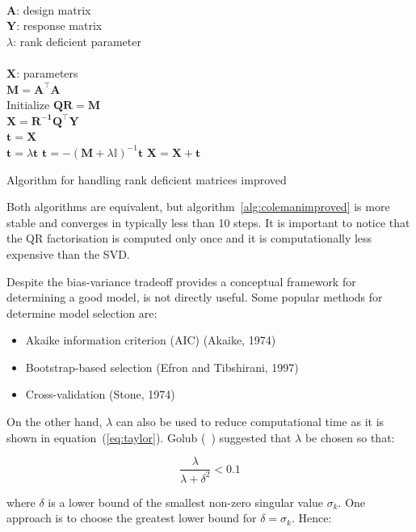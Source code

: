 \begin{algorithm}[H]
\begin{algorithmic}[1]
\REQUIRE $\,$ \\
$\mathbf{A}$: design matrix \\
$\mathbf{Y}$: response matrix \\
$\lambda$: rank deficient parameter \\
\ENSURE  $\,$ \\
$\mathbf{X}$: parameters \\
\STATE $\mathbf{M}=\mathbf{A^\top A}$ \\
\STATE Initialize $\mathbf{Q R}=\mathbf{M}$ \\
\STATE $\mathbf{X} = \mathbf{R^{-1}Q^\top Y}$ \\
\STATE $\mathbf{t} = \mathbf{X}$ \\
        \STATE $\mathbf{t} =\lambda \mathbf{t}$  
        \STATE $\mathbf{t} =  -(\mathbf{M}+\lambda\mathbb{I})^{-1}\mathbf{t}$
	\STATE $\mathbf{X}=\mathbf{X} + \mathbf{t}$
\ENDFOR
\end{algorithmic}
\caption{Algorithm for handling rank deficient matrices improved}
\label{alg:colemanimproved}
\end{algorithm}

Both algorithms are equivalent, but algorithm~\ref{alg:colemanimproved} is more
stable and converges in typically less than 10 steps.
It is important to notice that the QR factorisation is computed only once and it
is computationally less expensive than the SVD.


Despite the bias-variance tradeoff provides a conceptual framework for
determining a good model, is not directly useful. Some popular methods
for determine model selection are:

\begin{itemize}
    \item Akaike information criterion (AIC) (Akaike, 1974)
    \item Bootstrap-based selection (Efron and Tibshirani, 1997)
    \item Cross-validation (Stone, 1974)
\end{itemize}

On the other hand, $\lambda$ can also be used to reduce computational time as it
is shown in equation~(\ref{eq:taylor}). Golub (~\cite{golub1965}) suggested that
$\lambda$ be chosen so that:

\[
\frac{\lambda}{\lambda + \delta^2} < 0.1
\]

\noindent where $\delta$ is a lower bound of the smallest non-zero singular
value $\sigma_k$. One approach is to choose the greatest lower bound for
$\delta=\sigma_k$. Hence:

